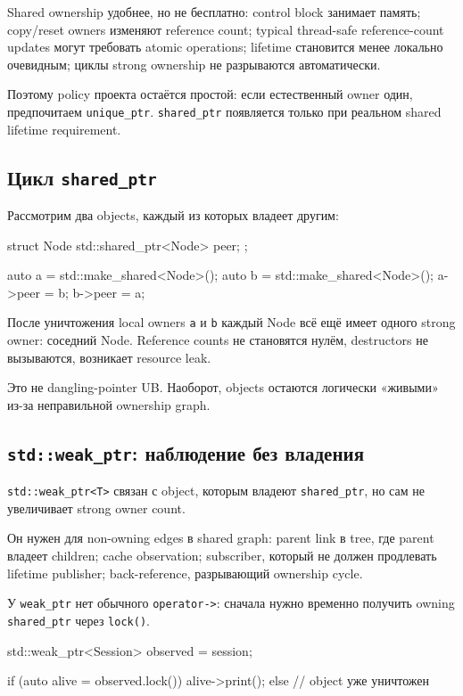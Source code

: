 Shared ownership удобнее, но не бесплатно:
control block занимает память; copy/reset owners изменяют reference count; typical thread-safe reference-count updates могут требовать atomic operations; lifetime становится менее локально очевидным; циклы strong ownership не разрываются автоматически.

Поэтому policy проекта остаётся простой: если естественный owner один,
предпочитаем \texttt{unique\_ptr}. \texttt{shared\_ptr} появляется только при
реальном shared lifetime requirement.

\subsection{Цикл \texttt{shared\_ptr}}

Рассмотрим два objects, каждый из которых владеет другим:

\begin{cppcode}
struct Node {
    std::shared_ptr<Node> peer;
};

auto a = std::make_shared<Node>();
auto b = std::make_shared<Node>();
a->peer = b;
b->peer = a;
\end{cppcode}

После уничтожения local owners \texttt{a} и \texttt{b} каждый Node всё ещё
имеет одного strong owner: соседний Node. Reference counts не становятся нулём,
destructors не вызываются, возникает resource leak.

Это не dangling-pointer UB. Наоборот, objects остаются логически «живыми»
из-за неправильной ownership graph.

\subsection{\texttt{std::weak\_ptr}: наблюдение без владения}

\texttt{std::weak\_ptr<T>} связан с object, которым владеют
\texttt{shared\_ptr}, но сам не увеличивает strong owner count.

Он нужен для non-owning edges в shared graph:
parent link в tree, где parent владеет children; cache observation; subscriber, который не должен продлевать lifetime publisher; back-reference, разрывающий ownership cycle.

У \texttt{weak\_ptr} нет обычного \texttt{operator->}: сначала нужно временно
получить owning \texttt{shared\_ptr} через \texttt{lock()}.

\begin{cppcode}
std::weak_ptr<Session> observed = session;

if (auto alive = observed.lock()) {
    alive->print();
} else {
    // object уже уничтожен
}
\end{cppcode}

